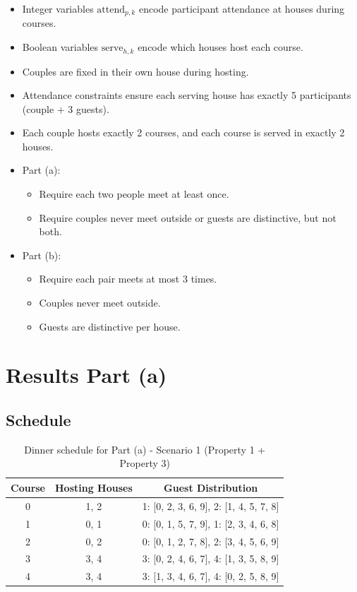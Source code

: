 \documentclass{article}
\begin{document}
\begin{itemize}
    \item Integer variables $\text{attend}_{p,k}$ encode participant attendance at houses during courses.
    \item Boolean variables $\text{serve}_{h,k}$ encode which houses host each course.
    \item Couples are fixed in their own house during hosting.
    \item Attendance constraints ensure each serving house has exactly 5 participants (couple + 3 guests).
    \item Each couple hosts exactly 2 courses, and each course is served in exactly 2 houses.
    \item Part (a):
    \begin{itemize}
        \item Require each two people meet at least once.
        \item Require couples never meet outside or guests are distinctive, but not both.
    \end{itemize}
    \item Part (b):
    \begin{itemize}
        \item Require each pair meets at most 3 times.
        \item Couples never meet outside.
        \item Guests are distinctive per house.
    \end{itemize}
\end{itemize}


\section{Results Part (a)}

\subsection{Schedule}

\begin{table}[H]
\centering
\caption{Dinner schedule for Part (a) - Scenario 1 (Property 1 + Property 3)}
\small
\begin{tabular}{c|c|c}
\toprule
Course & Hosting Houses & Guest Distribution \\
\midrule
0 & 1, 2 & 1: [0, 2, 3, 6, 9], 2: [1, 4, 5, 7, 8] \\
1 & 0, 1 & 0: [0, 1, 5, 7, 9], 1: [2, 3, 4, 6, 8] \\
2 & 0, 2 & 0: [0, 1, 2, 7, 8], 2: [3, 4, 5, 6, 9] \\
3 & 3, 4 & 3: [0, 2, 4, 6, 7], 4: [1, 3, 5, 8, 9] \\
4 & 3, 4 & 3: [1, 3, 4, 6, 7], 4: [0, 2, 5, 8, 9] \\
\bottomrule
\end{tabular}
\end{table}
\end{document}
